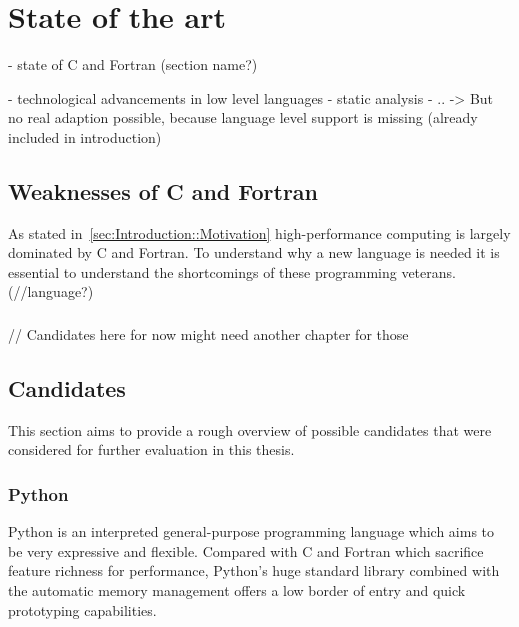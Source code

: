 \chapter{State of the art}
\label{chap:State_of_the_art}


- state of C and Fortran (section name?)

- technological advancements in low level languages
    - static analysis
    - ..
    -> But no real adaption possible, because language level support is missing (already included in introduction)

\section{Weaknesses of C and Fortran} %
\label{sec:State_of_the_art::Weaknesses}

As stated in~\autoref{sec:Introduction::Motivation} high-performance computing is largely dominated by C and Fortran. To understand why a new language is needed it is essential to understand the shortcomings of these programming veterans. (//language?)

\subsection*{}

// Candidates here for now might need another chapter for those
\section{Candidates}
\label{sec:State_of_the_art::Candidates}

This section aims to provide a rough overview of possible candidates that were considered for further evaluation in this thesis.

\subsection*{Python}
\label{subsec:State_of_the_art::Candidates::Python}

Python is an interpreted general-purpose programming language which aims to be very expressive and flexible. Compared with C and Fortran which sacrifice feature richness for performance, Python's huge standard library combined with the automatic memory management offers a low border of entry and quick prototyping capabilities.

